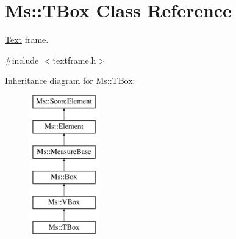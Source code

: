 \hypertarget{class_ms_1_1_t_box}{}\section{Ms\+:\+:T\+Box Class Reference}
\label{class_ms_1_1_t_box}


\hyperlink{class_ms_1_1_text}{Text} frame.  




{\ttfamily \#include $<$textframe.\+h$>$}

Inheritance diagram for Ms\+:\+:T\+Box\+:\begin{figure}[H]
\begin{center}
\leavevmode
\includegraphics[height=6.000000cm]{class_ms_1_1_t_box}
\end{center}
\end{figure}
